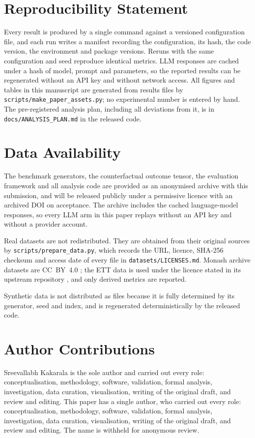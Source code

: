\section*{Reproducibility Statement}

Every result is produced by a single command against a versioned configuration file, and
each run writes a manifest recording the configuration, its hash, the code version, the
environment and package versions. Reruns with the same configuration and seed reproduce
identical metrics. LLM responses are cached under a hash of model, prompt and parameters,
so the reported results can be regenerated without an API key and without network
access. All figures and tables in this manuscript are generated from results files by
\texttt{scripts/make\_paper\_assets.py}; no experimental number is entered by hand. The
pre-registered analysis plan, including all deviations from it, is in
\texttt{docs/ANALYSIS\_PLAN.md} in the released code.

\section*{Data Availability}

The benchmark generators, the counterfactual outcome tensor, the evaluation framework
and all analysis code are provided as an anonymised archive with this submission, and
will be released publicly under a permissive licence with an archived DOI on acceptance.
The archive includes the cached language-model responses, so every LLM arm in this paper
replays without an API key and without a provider account.

Real datasets are not redistributed. They are obtained from their original sources by
\texttt{scripts/prepare\_data.py}, which records the URL, licence, SHA-256 checksum and
access date of every file in \texttt{datasets/LICENSES.md}. Monash archive datasets are
CC~BY~4.0 \citep{monash2021}; the ETT data is used under the licence stated in its
upstream repository \citep{informer2021}, and only derived metrics are reported.

Synthetic data is not distributed as files because it is fully determined by its
generator, seed and index, and is regenerated deterministically by the released code.

\section*{Author Contributions}

\ifcameraready
Sreevallabh Kakarala is the sole author and carried out every role:
conceptualisation, methodology, software, validation, formal analysis,
investigation, data curation, visualisation, writing of the original draft, and
review and editing.
\else
This paper has a single author, who carried out every role: conceptualisation,
methodology, software, validation, formal analysis, investigation, data curation,
visualisation, writing of the original draft, and review and editing. The name is
withheld for anonymous review.
\fi
